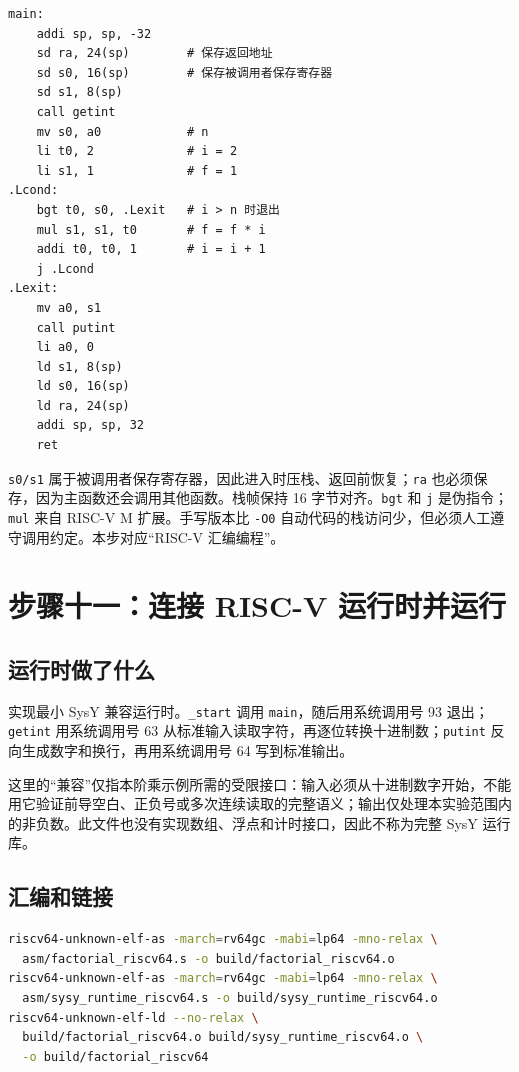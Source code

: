 \documentclass[UTF8,a4paper,12pt]{ctexart}
\begin{document}
\begin{lstlisting}
main:
    addi sp, sp, -32
    sd ra, 24(sp)        # 保存返回地址
    sd s0, 16(sp)        # 保存被调用者保存寄存器
    sd s1, 8(sp)
    call getint
    mv s0, a0            # n
    li t0, 2             # i = 2
    li s1, 1             # f = 1
.Lcond:
    bgt t0, s0, .Lexit   # i > n 时退出
    mul s1, s1, t0       # f = f * i
    addi t0, t0, 1       # i = i + 1
    j .Lcond
.Lexit:
    mv a0, s1
    call putint
    li a0, 0
    ld s1, 8(sp)
    ld s0, 16(sp)
    ld ra, 24(sp)
    addi sp, sp, 32
    ret
\end{lstlisting}

\texttt{s0/s1} 属于被调用者保存寄存器，因此进入时压栈、返回前恢复；\texttt{ra} 也必须保存，因为主函数还会调用其他函数。栈帧保持 16 字节对齐。\texttt{bgt} 和 \texttt{j} 是伪指令；\texttt{mul} 来自 RISC-V M 扩展。手写版本比 \texttt{-O0} 自动代码的栈访问少，但必须人工遵守调用约定。本步对应“RISC-V 汇编编程”。

\section{步骤十一：连接 RISC-V 运行时并运行}

\subsection{运行时做了什么}

 实现最小 SysY 兼容运行时。\texttt{\_start} 调用 \texttt{main}，随后用系统调用号 93 退出；\texttt{getint} 用系统调用号 63 从标准输入读取字符，再逐位转换十进制数；\texttt{putint} 反向生成数字和换行，再用系统调用号 64 写到标准输出。

这里的“兼容”仅指本阶乘示例所需的受限接口：输入必须从十进制数字开始，不能用它验证前导空白、正负号或多次连续读取的完整语义；输出仅处理本实验范围内的非负数。此文件也没有实现数组、浮点和计时接口，因此不称为完整 SysY 运行库。

\subsection{汇编和链接}

\begin{lstlisting}[language=bash]
riscv64-unknown-elf-as -march=rv64gc -mabi=lp64 -mno-relax \
  asm/factorial_riscv64.s -o build/factorial_riscv64.o
riscv64-unknown-elf-as -march=rv64gc -mabi=lp64 -mno-relax \
  asm/sysy_runtime_riscv64.s -o build/sysy_runtime_riscv64.o
riscv64-unknown-elf-ld --no-relax \
  build/factorial_riscv64.o build/sysy_runtime_riscv64.o \
  -o build/factorial_riscv64
\end{lstlisting}
\end{document}
